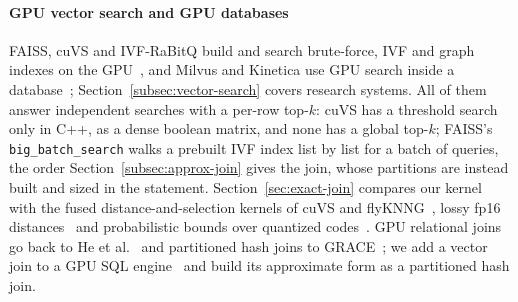 \paragraph{GPU vector search and GPU databases}
FAISS, cuVS and IVF-RaBitQ build and search brute-force, IVF and graph indexes on the GPU~\cite{JohnsonFaissGPU21, NvidiaCuVS26, OotomoCAGRA24, ShiIVFRaBitQ26}, and Milvus and Kinetica use GPU search inside a database~\cite{MilvusGPUIndex, KineticaVectorSearch}; Section~\ref{subsec:vector-search} covers research systems.
All of them answer independent searches with a per-row top-$k$: cuVS has a threshold search only in C++, as a dense boolean matrix, and none has a global top-$k$; FAISS's \texttt{big\_batch\_search} walks a prebuilt IVF index list by list for a batch of queries, the order Section~\ref{subsec:approx-join} gives the join, whose partitions are instead built and sized in the statement.
Section~\ref{sec:exact-join} compares our kernel with the fused distance-and-selection kernels of cuVS and flyKNNG~\cite{JiFlyKNNG22}, lossy fp16 distances~\cite{CurlessFaSTED25} and probabilistic bounds over quantized codes~\cite{GaoRaBitQ24}.
GPU relational joins go back to He et al.~\cite{HeGPUJoins08} and partitioned hash joins to GRACE~\cite{KitsuregawaGrace83}; we add a vector join to a GPU SQL engine~\cite{Yogatama26} and build its approximate form as a partitioned hash join.
